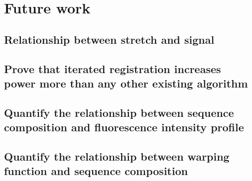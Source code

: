 \chapter{Future work}

\section{Relationship between stretch and signal}

\section{Prove that iterated registration increases power more than any other existing algorithm}

\section{Quantify the relationship between sequence composition and fluorescence intensity profile}

\section{Quantify the relationship between warping function and sequence composition}



